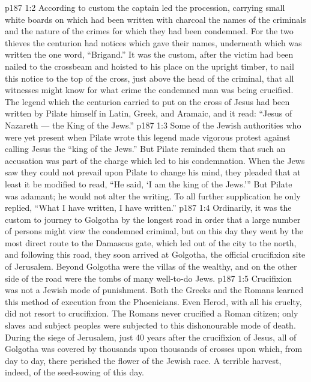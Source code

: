 \vs p187 1:2 According to custom the captain led the procession, carrying small white boards on which had been written with charcoal the names of the criminals and the nature of the crimes for which they had been condemned. For the two thieves the centurion had notices which gave their names, underneath which was written the one word, “Brigand.” It was the custom, after the victim had been nailed to the crossbeam and hoisted to his place on the upright timber, to nail this notice to the top of the cross, just above the head of the criminal, that all witnesses might know for what crime the condemned man was being crucified. The legend which the centurion carried to put on the cross of Jesus had been written by Pilate himself in Latin, Greek, and Aramaic, and it read: “Jesus of Nazareth --- the King of the Jews.”
\vs p187 1:3 Some of the Jewish authorities who were yet present when Pilate wrote this legend made vigorous protest against calling Jesus the “king of the Jews.” But Pilate reminded them that such an accusation was part of the charge which led to his condemnation. When the Jews saw they could not prevail upon Pilate to change his mind, they pleaded that at least it be modified to read, “He said, ‘I am the king of the Jews.’” But Pilate was adamant; he would not alter the writing. To all further supplication he only replied, “What I have written, I have written.”
\vs p187 1:4 Ordinarily, it was the custom to journey to Golgotha by the longest road in order that a large number of persons might view the condemned criminal, but on this day they went by the most direct route to the Damascus gate, which led out of the city to the north, and following this road, they soon arrived at Golgotha, the official crucifixion site of Jerusalem. Beyond Golgotha were the villas of the wealthy, and on the other side of the road were the tombs of many well\hyp{}to\hyp{}do Jews.
\vs p187 1:5 \pc Crucifixion was not a Jewish mode of punishment. Both the Greeks and the Romans learned this method of execution from the Phoenicians. Even Herod, with all his cruelty, did not resort to crucifixion. The Romans never crucified a Roman citizen; only slaves and subject peoples were subjected to this dishonourable mode of death. During the siege of Jerusalem, just 40 years after the crucifixion of Jesus, all of Golgotha was covered by thousands upon thousands of crosses upon which, from day to day, there perished the flower of the Jewish race. A terrible harvest, indeed, of the seed\hyp{}sowing of this day.
